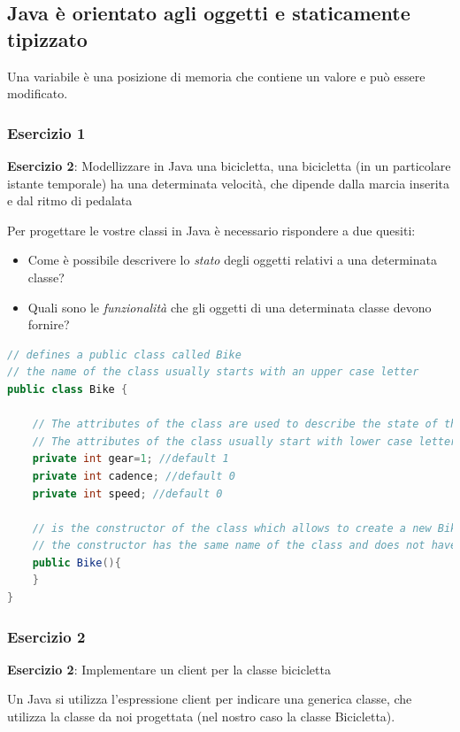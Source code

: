 \documentclass{article}
\theoremstyle{definition}
\begin{document}
\subsection{Java \`e orientato agli oggetti e staticamente tipizzato}
Una variabile \`e una posizione di memoria che contiene un valore e pu\`o essere modificato. 


\subsubsection{Esercizio 1}
\begin{framed}
\textbf{Esercizio 2}: Modellizzare in Java una bicicletta, una bicicletta (in un particolare istante temporale) ha una determinata velocit\`a, che dipende dalla marcia inserita e dal ritmo di pedalata
\end{framed}

Per progettare le vostre classi in Java \`e necessario rispondere a due quesiti:
\begin{itemize}
\item Come \`e possibile descrivere lo \emph{stato} degli oggetti relativi a una determinata classe?
\item Quali sono le \emph{funzionalit\`a} che gli oggetti di una determinata classe devono fornire?
\end{itemize}


\begin{lstlisting}[language=Java,escapechar=|]
// defines a public class called Bike 
// the name of the class usually starts with an upper case letter
public class Bike {
	
	// The attributes of the class are used to describe the state of the class and are usually private or protected 
	// The attributes of the class usually start with lower case letters
	private int gear=1; //default 1
	private int cadence; //default 0
	private int speed; //default 0
	
	// is the constructor of the class which allows to create a new Bike
	// the constructor has the same name of the class and does not have a return type
	public Bike(){
	}
}
\end{lstlisting}


\subsubsection{Esercizio 2}
\begin{framed}
\textbf{Esercizio 2}: Implementare un client per la classe bicicletta
\end{framed}
Un Java si utilizza l'espressione client per indicare una generica classe, che utilizza la classe da noi progettata (nel nostro caso la classe Bicicletta). 
\end{document}
